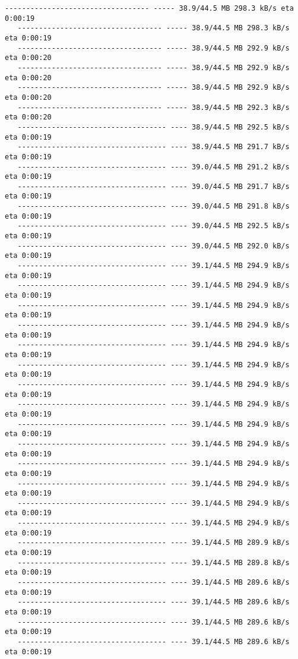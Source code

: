 \documentclass[11pt]{article}
\begin{document}
\begin{Verbatim}[commandchars=\\\{\}]
   ---------------------------------- ----- 38.9/44.5 MB 298.3 kB/s eta 0:00:19
   ---------------------------------- ----- 38.9/44.5 MB 298.3 kB/s eta 0:00:19
   ---------------------------------- ----- 38.9/44.5 MB 292.9 kB/s eta 0:00:20
   ---------------------------------- ----- 38.9/44.5 MB 292.9 kB/s eta 0:00:20
   ---------------------------------- ----- 38.9/44.5 MB 292.9 kB/s eta 0:00:20
   ---------------------------------- ----- 38.9/44.5 MB 292.3 kB/s eta 0:00:20
   ----------------------------------- ---- 38.9/44.5 MB 292.5 kB/s eta 0:00:19
   ----------------------------------- ---- 38.9/44.5 MB 291.7 kB/s eta 0:00:19
   ----------------------------------- ---- 39.0/44.5 MB 291.2 kB/s eta 0:00:19
   ----------------------------------- ---- 39.0/44.5 MB 291.7 kB/s eta 0:00:19
   ----------------------------------- ---- 39.0/44.5 MB 291.8 kB/s eta 0:00:19
   ----------------------------------- ---- 39.0/44.5 MB 292.5 kB/s eta 0:00:19
   ----------------------------------- ---- 39.0/44.5 MB 292.0 kB/s eta 0:00:19
   ----------------------------------- ---- 39.1/44.5 MB 294.9 kB/s eta 0:00:19
   ----------------------------------- ---- 39.1/44.5 MB 294.9 kB/s eta 0:00:19
   ----------------------------------- ---- 39.1/44.5 MB 294.9 kB/s eta 0:00:19
   ----------------------------------- ---- 39.1/44.5 MB 294.9 kB/s eta 0:00:19
   ----------------------------------- ---- 39.1/44.5 MB 294.9 kB/s eta 0:00:19
   ----------------------------------- ---- 39.1/44.5 MB 294.9 kB/s eta 0:00:19
   ----------------------------------- ---- 39.1/44.5 MB 294.9 kB/s eta 0:00:19
   ----------------------------------- ---- 39.1/44.5 MB 294.9 kB/s eta 0:00:19
   ----------------------------------- ---- 39.1/44.5 MB 294.9 kB/s eta 0:00:19
   ----------------------------------- ---- 39.1/44.5 MB 294.9 kB/s eta 0:00:19
   ----------------------------------- ---- 39.1/44.5 MB 294.9 kB/s eta 0:00:19
   ----------------------------------- ---- 39.1/44.5 MB 294.9 kB/s eta 0:00:19
   ----------------------------------- ---- 39.1/44.5 MB 294.9 kB/s eta 0:00:19
   ----------------------------------- ---- 39.1/44.5 MB 294.9 kB/s eta 0:00:19
   ----------------------------------- ---- 39.1/44.5 MB 289.9 kB/s eta 0:00:19
   ----------------------------------- ---- 39.1/44.5 MB 289.8 kB/s eta 0:00:19
   ----------------------------------- ---- 39.1/44.5 MB 289.6 kB/s eta 0:00:19
   ----------------------------------- ---- 39.1/44.5 MB 289.6 kB/s eta 0:00:19
   ----------------------------------- ---- 39.1/44.5 MB 289.6 kB/s eta 0:00:19
   ----------------------------------- ---- 39.1/44.5 MB 289.6 kB/s eta 0:00:19

\end{Verbatim}
\end{document}
